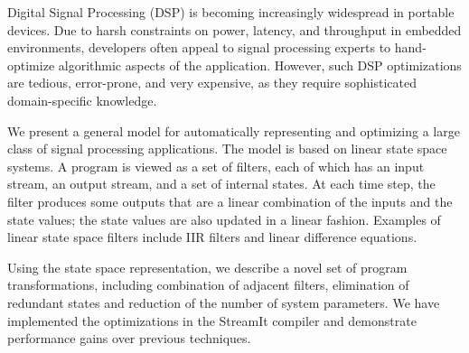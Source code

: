 Digital Signal Processing (DSP) is becoming increasingly widespread in
portable devices. Due to harsh constraints on power, latency, and
throughput in embedded environments, developers often appeal to signal
processing experts to hand-optimize algorithmic aspects of the
application.  However, such DSP optimizations are tedious,
error-prone, and very expensive, as they require sophisticated
domain-specific knowledge.

We present a general model for automatically representing and
optimizing a large class of signal processing applications. The model
is based on linear state space systems. A program is viewed as a set
of filters, each of which has an input stream, an output stream, and a
set of internal states. At each time step, the filter produces some
outputs that are a linear combination of the inputs and the state
values; the state values are also updated in a linear
fashion. Examples of linear state space filters include IIR filters
and linear difference equations.

Using the state space representation, we describe a novel set of
program transformations, including combination of adjacent filters,
elimination of redundant states and reduction of the number of system
parameters. We have implemented the optimizations in the StreamIt
compiler and demonstrate performance gains over previous techniques.
